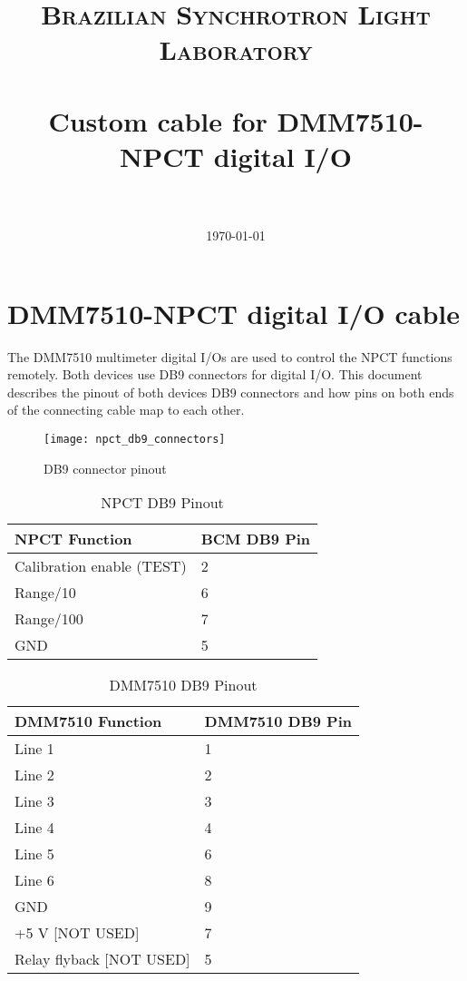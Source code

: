 \documentclass[paper=a4, fontsize=11pt]{scrartcl}
\title{
		\usefont{OT1}{bch}{b}{n}
		\normalfont \normalsize \textsc{Brazilian Synchrotron Light Laboratory} \\ [25pt]
		\horrule{0.5pt} \\[0.4cm]
		\huge Custom cable for DMM7510-NPCT digital I/O \\
		\horrule{2pt} \\[0.5cm]
}
\author{
		\normalfont 								\normalsize
        \today
}
\date{}
\numberwithin{figure}{section}			%
\numberwithin{table}{section}			%
\begin{document}
\maketitle
\section{DMM7510-NPCT digital I/O cable}
The DMM7510 multimeter digital I/Os are used to control the NPCT functions remotely. Both devices use DB9 connectors for digital I/O. This document describes the pinout of both devices DB9 connectors and how pins on both ends of the connecting cable map to each other.

\begin{figure}[!h]
	\caption{DB9 connector pinout}
	\label{fig:db9-pins}
	\centering
	\texttt{[image: npct\_db9\_connectors]}
\end{figure}
\FloatBarrier

\begin{table}
	\center
	\caption{NPCT DB9 Pinout}
	\begin{tabular}{m{8cm} m{2cm}}
		\bfseries NPCT Function & \bfseries BCM DB9 Pin \\ \hline
		Calibration enable (TEST) & 2 \\ \hline
		Range/10 & 6 \\ \hline
		Range/100 & 7 \\ \hline
		GND & 5 \\ \hline
	\end{tabular}
\end{table}

\begin{table}
	\center
	\caption{DMM7510 DB9 Pinout}
	\begin{tabular}{m{8cm} m{2cm}}
		\bfseries DMM7510 Function & \bfseries DMM7510 DB9 Pin \\ \hline
		Line 1 & 1 \\ \hline
		Line 2 & 2 \\ \hline
		Line 3 & 3 \\ \hline
		Line 4 & 4 \\ \hline
		Line 5 & 6 \\ \hline
		Line 6 & 8 \\ \hline
		GND & 9 \\ \hline
		+5 V [NOT USED] & 7 \\ \hline
		Relay flyback [NOT USED] & 5 \\ \hline
	\end{tabular}
\end{table}
\end{document}

